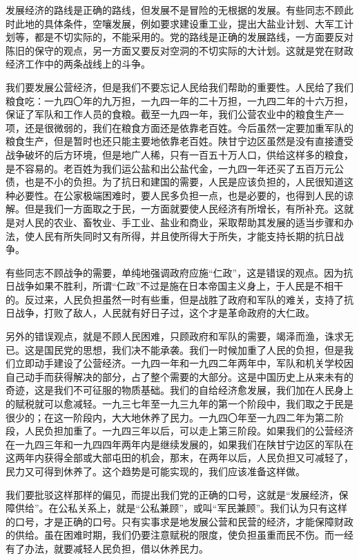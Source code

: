 发展经济的路线是正确的路线，但发展不是冒险的无根据的发展。有些同志不顾此时此地的具体条件，空嚷发展，例如要求建设重工业，提出大盐业计划、大军工计划等，都是不切实际的，不能采用的。党的路线是正确的发展路线，一方面要反对陈旧的保守的观点，另一方面又要反对空洞的不切实际的大计划。这就是党在财政经济工作中的两条战线上的斗争。

我们要发展公营经济，但是我们不要忘记人民给我们帮助的重要性。人民给了我们粮食吃：一九四〇年的九万担，一九四一年的二十万担，一九四二年的十六万担，保证了军队和工作人员的食粮。截至一九四一年，我们公营农业中的粮食生产一项，还是很微弱的，我们在粮食方面还是依靠老百姓。今后虽然一定要加重军队的粮食生产，但是暂时也还只能主要地依靠老百姓。陕甘宁边区虽然是没有直接遭受战争破坏的后方环境，但是地广人稀，只有一百五十万人口，供给这样多的粮食，是不容易的。老百姓为我们运公盐和出公盐代金，一九四一年还买了五百万元公债，也是不小的负担。为了抗日和建国的需要，人民是应该负担的，人民很知道这种必要性。在公家极端困难时，要人民多负担一点，也是必要的，也得到人民的谅解。但是我们一方面取之于民，一方面就要使人民经济有所增长，有所补充。这就是对人民的农业、畜牧业、手工业、盐业和商业，采取帮助其发展的适当步骤和办法，使人民有所失同时又有所得，并且使所得大于所失，才能支持长期的抗日战争。

有些同志不顾战争的需要，单纯地强调政府应施“仁政”，这是错误的观点。因为抗日战争如果不胜利，所谓“仁政”不过是施在日本帝国主义身上，于人民是不相干的。反过来，人民负担虽然一时有些重，但是战胜了政府和军队的难关，支持了抗日战争，打败了敌人，人民就有好日子过，这个才是革命政府的大仁政。

另外的错误观点，就是不顾人民困难，只顾政府和军队的需要，竭泽而渔，诛求无已。这是国民党的思想，我们决不能承袭。我们一时候加重了人民的负担，但是我们立即动手建设了公营经济。一九四一年和一九四二年两年中，军队和机关学校因自己动手而获得解决的部分，占了整个需要的大部分。这是中国历史上从来未有的奇迹，这是我们不可征服的物质基础。我们的自给经济愈发展，我们加在人民身上的赋税就可以愈减轻。一九三七年至一九三九年的第一个阶段中，我们取之于民是很少的；在这一阶段内，大大地休养了民力。一九四〇年至一九四二年为第二阶段，人民负担加重了。一九四三年以后，可以走上第三阶段。如果我们的公营经济在一九四三年和一九四四年两年内是继续发展的，如果我们在陕甘宁边区的军队在这两年内获得全部或大部屯田的机会，那末，在两年以后，人民负担又可减轻了，民力又可得到休养了。这个趋势是可能实现的，我们应该准备这样做。

我们要批驳这样那样的偏见，而提出我们党的正确的口号，这就是“发展经济，保障供给”。在公私关系上，就是“公私兼顾”，或叫“军民兼顾”。我们认为只有这样的口号，才是正确的口号。只有实事求是地发展公营和民营的经济，才能保障财政的供给。虽在困难时期，我们仍要注意赋税的限度，使负担虽重而民不伤。而一经有了办法，就要减轻人民负担，借以休养民力。

